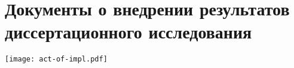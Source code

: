 
\chapter{%
Документы о внедрении результатов диссертационного исследования
}
\label{app:impl}

\noindent
\texttt{[image: act-of-impl.pdf]}
